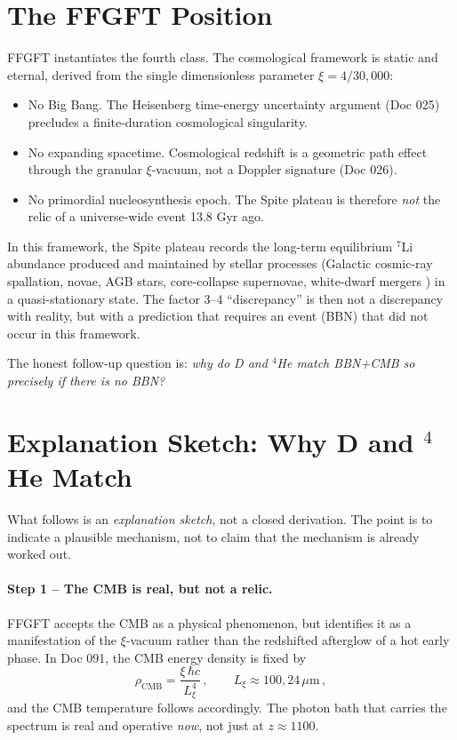 \documentclass[11pt,a4paper]{article}
\begin{document}
\section{The FFGFT Position}

FFGFT instantiates the fourth class. The cosmological framework is static and eternal, derived from the single dimensionless parameter $\xi = 4/30{,}000$:
\begin{itemize}\itemsep1pt
\item No Big Bang. The Heisenberg time-energy uncertainty argument (Doc 025) precludes a finite-duration cosmological singularity.
\item No expanding spacetime. Cosmological redshift is a geometric path effect through the granular $\xi$-vacuum, not a Doppler signature (Doc 026).
\item No primordial nucleosynthesis epoch. The Spite plateau is therefore \emph{not} the relic of a universe-wide event 13.8 Gyr ago.
\end{itemize}

In this framework, the Spite plateau records the long-term equilibrium $^7$Li abundance produced and maintained by stellar processes (Galactic cosmic-ray spallation, novae, AGB stars, core-collapse supernovae, white-dwarf mergers \cite{borisov2024}) in a quasi-stationary state. The factor 3--4 ``discrepancy'' is then not a discrepancy with reality, but with a prediction that requires an event (BBN) that did not occur in this framework.

The honest follow-up question is: \emph{why do D and $^4$He match BBN+CMB so precisely if there is no BBN?}

\section{Explanation Sketch: Why D and \texorpdfstring{$^4$He}{4He} Match}

What follows is an \emph{explanation sketch}, not a closed derivation. The point is to indicate a plausible mechanism, not to claim that the mechanism is already worked out.

\paragraph{Step 1 -- The CMB is real, but not a relic.}
FFGFT accepts the CMB as a physical phenomenon, but identifies it as a manifestation of the $\xi$-vacuum rather than the redshifted afterglow of a hot early phase. In Doc 091, the CMB energy density is fixed by
\begin{equation}
\rho_{\mathrm{CMB}} = \frac{\xi\,\hbar c}{L_\xi^4}\,, \qquad L_\xi \approx 100{,}24\,\mu\text{m}\,,
\end{equation}
and the CMB temperature follows accordingly. The photon bath that carries the spectrum is real and operative \emph{now}, not just at $z \approx 1100$.
\end{document}
